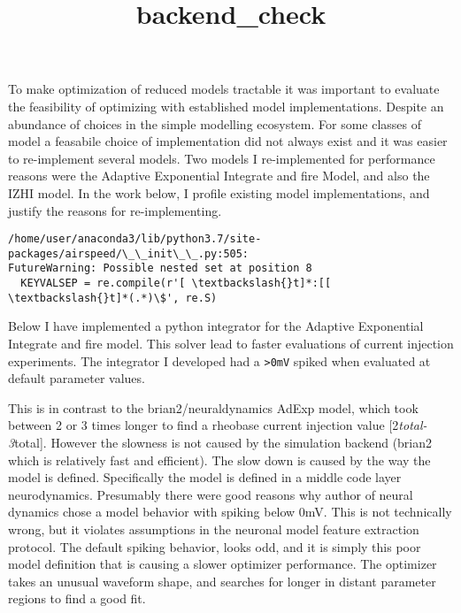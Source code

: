 \documentclass[11pt]{article}
\title{backend\_check}
\begin{document}
    
    \maketitle
    
    

    
    To make optimization of reduced models tractable it was important to
evaluate the feasibility of optimizing with established model
implementations. Despite an abundance of choices in the simple modelling
ecosystem. For some classes of model a feasabile choice of
implementation did not always exist and it was easier to re-implement
several models. Two models I re-implemented for performance reasons were
the Adaptive Exponential Integrate and fire Model, and also the IZHI
model. In the work below, I profile existing model implementations, and
justify the reasons for re-implementing.

    \begin{Verbatim}[commandchars=\\\{\}]
/home/user/anaconda3/lib/python3.7/site-packages/airspeed/\_\_init\_\_.py:505:
FutureWarning: Possible nested set at position 8
  KEYVALSEP = re.compile(r'[ \textbackslash{}t]*:[[ \textbackslash{}t]*(.*)\$', re.S)
    \end{Verbatim}

    Below I have implemented a python integrator for the Adaptive
Exponential Integrate and fire model. This solver lead to faster
evaluations of current injection experiments. The integrator I developed
had a \texttt{\textgreater{}0mV} spiked when evaluated at default
parameter values.

This is in contrast to the brian2/neuraldynamics AdExp model, which took
between 2 or 3 times longer to find a rheobase current injection value
{[}2\emph{total-3}total{]}. However the slowness is not caused by the
simulation backend (brian2 which is relatively fast and efficient). The
slow down is caused by the way the model is defined. Specifically the
model is defined in a middle code layer neurodynamics. Presumably there
were good reasons why author of neural dynamics chose a model behavior
with spiking below 0mV. This is not technically wrong, but it violates
assumptions in the neuronal model feature extraction protocol. The
default spiking behavior, looks odd, and it is simply this poor model
definition that is causing a slower optimizer performance. The optimizer
takes an unusual waveform shape, and searches for longer in distant
parameter regions to find a good fit.
\end{document}
